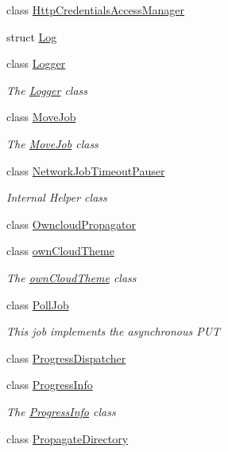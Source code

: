 \begin{DoxyCompactItemize}
class \hyperlink{class_o_c_c_1_1_http_credentials_access_manager}{Http\+Credentials\+Access\+Manager}
\item 
struct \hyperlink{struct_o_c_c_1_1_log}{Log}
\item 
class \hyperlink{class_o_c_c_1_1_logger}{Logger}
\begin{DoxyCompactList}\small\item\em The \hyperlink{class_o_c_c_1_1_logger}{Logger} class \end{DoxyCompactList}\item 
class \hyperlink{class_o_c_c_1_1_move_job}{Move\+Job}
\begin{DoxyCompactList}\small\item\em The \hyperlink{class_o_c_c_1_1_move_job}{Move\+Job} class \end{DoxyCompactList}\item 
class \hyperlink{class_o_c_c_1_1_network_job_timeout_pauser}{Network\+Job\+Timeout\+Pauser}
\begin{DoxyCompactList}\small\item\em Internal Helper class \end{DoxyCompactList}\item 
class \hyperlink{class_o_c_c_1_1_owncloud_propagator}{Owncloud\+Propagator}
\item 
class \hyperlink{class_o_c_c_1_1own_cloud_theme}{own\+Cloud\+Theme}
\begin{DoxyCompactList}\small\item\em The \hyperlink{class_o_c_c_1_1own_cloud_theme}{own\+Cloud\+Theme} class \end{DoxyCompactList}\item 
class \hyperlink{class_o_c_c_1_1_poll_job}{Poll\+Job}
\begin{DoxyCompactList}\small\item\em This job implements the asynchronous P\+UT \end{DoxyCompactList}\item 
class \hyperlink{class_o_c_c_1_1_progress_dispatcher}{Progress\+Dispatcher}
\item 
class \hyperlink{class_o_c_c_1_1_progress_info}{Progress\+Info}
\begin{DoxyCompactList}\small\item\em The \hyperlink{class_o_c_c_1_1_progress_info}{Progress\+Info} class \end{DoxyCompactList}\item 
class \hyperlink{class_o_c_c_1_1_propagate_directory}{Propagate\+Directory}

\end{DoxyCompactItemize}
